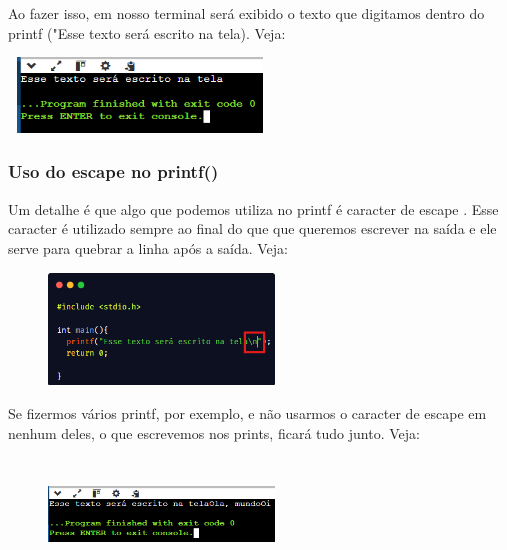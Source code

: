 \documentclass{report}
\begin{document}
	Ao fazer isso, em nosso terminal será exibido o texto que digitamos dentro do printf ("Esse texto será escrito na tela). Veja:
	
	\begin{center}
		
		\includegraphics[width=7cm,height=2cm,keepaspectratio=false]{imagens/outputc.png}
	\end{center}
	
	\subsubsection{Uso do escape no printf()}
	Um detalhe é que algo que podemos utiliza no printf é caracter de escape . Esse caracter é utilizado sempre ao final do que que queremos escrever na saída e ele serve para quebrar a linha após a saída. Veja:
	
	\begin{figure}[ht]
		\centering
		\includegraphics[width=6cm,height=3cm,keepaspectratio=false]{imagens/escape.png}
		
	\end{figure}
	
	
	Se fizermos vários printf, por exemplo, e não usarmos o caracter de escape em nenhum deles, o que escrevemos nos prints, ficará tudo junto. Veja:
	
	\begin{figure}[ht]
		\centering
		\includegraphics[width=6cm,height=3cm,keepaspectratio=false]{imagens/noescape.png}
	\end{figure}
	
\end{document}
